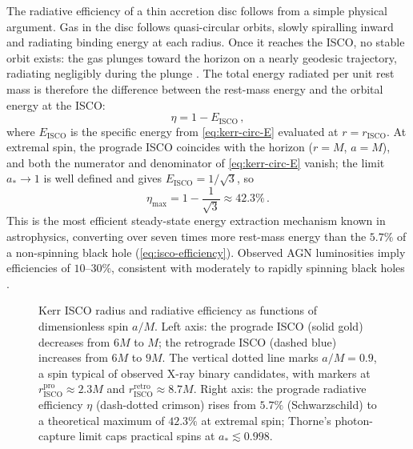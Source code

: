 The radiative efficiency of a thin accretion disc follows from a
simple physical argument.  Gas in the disc follows quasi-circular
orbits, slowly spiralling inward and radiating binding energy at
each radius.  Once it reaches the ISCO, no stable orbit exists:
the gas plunges toward the horizon on a nearly geodesic trajectory,
radiating negligibly during the plunge \cite{Novikov1973,Page1974}.
The total energy radiated per unit rest mass is therefore the
difference between the rest-mass energy and the orbital energy at
the ISCO:
%
\begin{equation}
  \eta = 1 - E_{\text{ISCO}} \,,
  \label{eq:kerr-efficiency}
\end{equation}
%
where $E_{\text{ISCO}}$ is the specific energy from
\cref{eq:kerr-circ-E} evaluated at $r = r_{\text{ISCO}}$.
At extremal spin, the prograde ISCO coincides with the horizon
($r = M$, $a = M$), and both the numerator and denominator of
\cref{eq:kerr-circ-E} vanish; the limit $a_* \to 1$ is
well defined and gives $E_{\text{ISCO}} = 1/\sqrt{3}$, so
%
\begin{equation}
  \eta_{\text{max}} = 1 - \frac{1}{\sqrt{3}} \approx 42.3\% \,.
  \label{eq:kerr-efficiency-max}
\end{equation}
%
This is the most efficient steady-state energy extraction mechanism
known in astrophysics, converting over seven times more rest-mass
energy than the $5.7\%$ of a non-spinning black hole
(\cref{eq:isco-efficiency}).  Observed AGN luminosities imply
efficiencies of $10$--$30\%$, consistent with moderately to rapidly
spinning black holes \cite{Thorne1974}.

\begin{figure}[htbp]
  \centering
  
  \caption[Kerr ISCO radius and radiative efficiency vs spin]{%
    Kerr ISCO radius and radiative efficiency as functions of
    dimensionless spin $a/M$.  Left axis: the prograde ISCO (solid
    gold) decreases from $6M$ to $M$; the retrograde ISCO (dashed
    blue) increases from $6M$ to $9M$.  The vertical dotted line
    marks $a/M = 0.9$, a spin typical of observed X-ray binary
    candidates, with markers at $r_{\text{ISCO}}^{\text{pro}}
    \approx 2.3M$ and $r_{\text{ISCO}}^{\text{retro}} \approx
    8.7M$.  Right axis: the prograde radiative efficiency $\eta$
    (dash-dotted crimson) rises from $5.7\%$ (Schwarzschild) to a
    theoretical maximum of $42.3\%$ at extremal spin; Thorne's
    photon-capture limit \cite{Thorne1974} caps practical spins at
    $a_* \lesssim 0.998$.}
  \label{fig:kerr-isco}
\end{figure}

